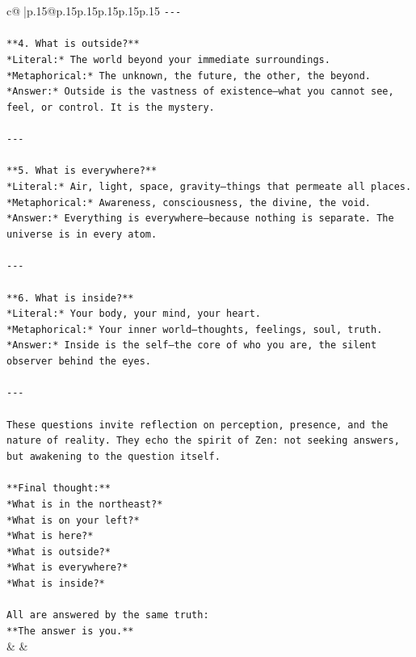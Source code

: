\documentclass{article}
\begin{document}
{\begin{supertabular}{c@{$\;$}|p{.15\linewidth}@{}p{.15\linewidth}p{.15\linewidth}p{.15\linewidth}p{.15\linewidth}p{.15\linewidth}}
{{{\texttt{{-}{-}{-}} \\
\\ 
\texttt{**4. What is outside?**  } \\
\texttt{*Literal:* The world beyond your immediate surroundings.  } \\
\texttt{*Metaphorical:* The unknown, the future, the other, the beyond.  } \\
\texttt{*Answer:* Outside is the vastness of existence—what you cannot see, feel, or control. It is the mystery.} \\
\\ 
\texttt{{-}{-}{-}} \\
\\ 
\texttt{**5. What is everywhere?**  } \\
\texttt{*Literal:* Air, light, space, gravity—things that permeate all places.  } \\
\texttt{*Metaphorical:* Awareness, consciousness, the divine, the void.  } \\
\texttt{*Answer:* Everything is everywhere—because nothing is separate. The universe is in every atom.} \\
\\ 
\texttt{{-}{-}{-}} \\
\\ 
\texttt{**6. What is inside?**  } \\
\texttt{*Literal:* Your body, your mind, your heart.  } \\
\texttt{*Metaphorical:* Your inner world—thoughts, feelings, soul, truth.  } \\
\texttt{*Answer:* Inside is the self—the core of who you are, the silent observer behind the eyes.} \\
\\ 
\texttt{{-}{-}{-}} \\
\\ 
\texttt{These questions invite reflection on perception, presence, and the nature of reality. They echo the spirit of Zen: not seeking answers, but awakening to the question itself.} \\
\\ 
\texttt{**Final thought:**  } \\
\texttt{*What is in the northeast?*  } \\
\texttt{*What is on your left?*  } \\
\texttt{*What is here?*  } \\
\texttt{*What is outside?*  } \\
\texttt{*What is everywhere?*  } \\
\texttt{*What is inside?*  } \\
\\ 
\texttt{All are answered by the same truth:  } \\
\texttt{**The answer is you.**} \\
            }
        }
    }
    & & \\ \\


\end{supertabular}}
\end{document}

